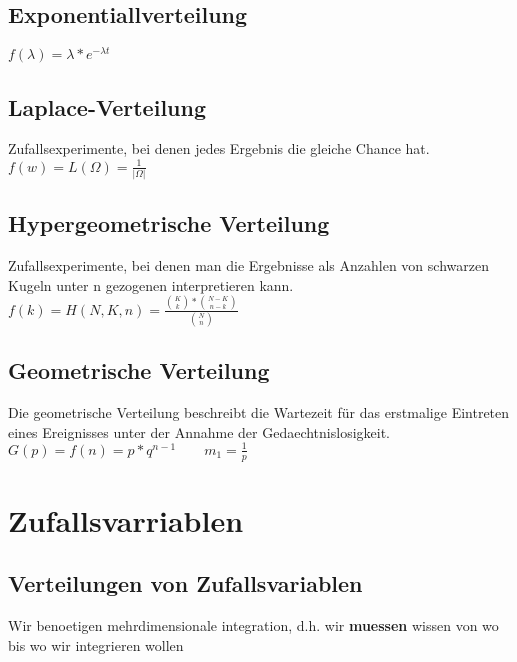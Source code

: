\documentclass{article}
\begin{document}
\subsection{Exponentiallverteilung}
	$f(\lambda) = \lambda*e^{-\lambda t}$

\subsection{Laplace-Verteilung}
	Zufallsexperimente, bei denen jedes Ergebnis die gleiche Chance hat. \\
	$f(w) = L(\Omega) = \frac{1}{|\Omega|}$
\subsection{Hypergeometrische Verteilung}
	Zufallsexperimente, bei denen man die Ergebnisse als Anzahlen von schwarzen Kugeln unter 	n gezogenen interpretieren kann. \\
	$f(k) = H(N, K, n) = \frac{\binom{K}{k}*\binom{N-K}{n-k}}{\binom{N}{n}}$
\subsection{Geometrische Verteilung}
	Die geometrische Verteilung beschreibt die Wartezeit für das erstmalige Eintreten eines 	
	Ereignisses unter der Annahme der Gedaechtnislosigkeit. \\
	$G(p) = f(n) = p*q^{n-1} \quad \quad m_1 = \frac{1}{p}$
\section{Zufallsvarriablen}
\subsection{Verteilungen von Zufallsvariablen}
	Wir benoetigen mehrdimensionale integration, d.h. wir \textbf{muessen} wissen von
	wo bis wo wir integrieren wollen \\ \\
\end{document}
